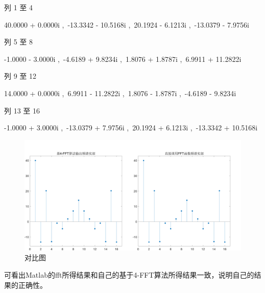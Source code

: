 \documentclass{../source/Experiment}
\begin{document}
列 1 至 4

40.0000 + 0.0000i ,\, -13.3342 - 10.5168i ,\, 20.1924 - 6.1213i ,\, -13.0379 - 7.9756i

列 5 至 8

-1.0000 - 3.0000i ,\, -4.6189 + 9.8234i ,\, 1.8076 + 1.8787i ,\, 6.9911 + 11.2822i

列 9 至 12

14.0000 + 0.0000i ,\, 6.9911 - 11.2822i ,\, 1.8076 - 1.8787i ,\, -4.6189 - 9.8234i

列 13 至 16

-1.0000 + 3.0000i ,\, -13.0379 + 7.9756i ,\, 20.1924 + 6.1213i ,\, -13.3342 + 10.5168i
\begin{figure}[H]
    \centering
    \includegraphics[width = 1.0\textwidth]{src/exp3_5.png}
    \caption{对比图}
\end{figure}
可看出Matlab的fft所得结果和自己的基于4-FFT算法所得结果一致，说明自己的结果的正确性。
\end{document}
